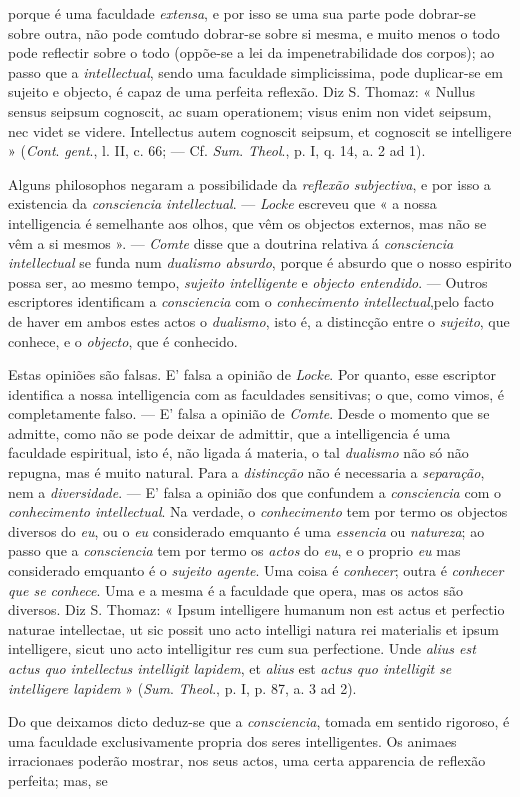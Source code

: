 porque é uma faculdade \emph{extensa}, e por isso se uma sua parte pode dobrar-se sobre outra, não pode comtudo dobrar-se sobre si mesma, e muito menos o todo pode reflectir sobre o todo (oppõe-se a lei da impenetrabilidade dos corpos); ao passo que a \emph{intellectual}, sendo uma faculdade simplicissima, pode duplicar-se em sujeito e objecto, é capaz de uma perfeita reflexão. Diz S. Thomaz: « Nullus sensus seipsum cognoscit, ac suam operationem; visus enim non videt seipsum, nec videt se videre. Intellectus autem cognoscit seipsum, et cognoscit se intelligere » (\emph{Cont}. \emph{gent}., l. II, c. 66; --- Cf. \emph{Sum}. \emph{Theol}., p. I, q. 14, a. 2 ad 1).\par Alguns philosophos negaram a possibilidade da \emph{reflexão subjectiva}, e por isso a existencia da \emph{consciencia intellectual}. --- \emph{Locke} escreveu que « a nossa intelligencia é semelhante aos olhos, que vêm os objectos externos, mas não se vêm a si mesmos ». --- \emph{Comte} disse que a doutrina relativa á \emph{consciencia intellectual} se funda num \emph{dualismo absurdo}, porque é absurdo que o nosso espirito possa ser, ao mesmo tempo, \emph{sujeito intelligente} e \emph{objecto entendido}. --- Outros escriptores identificam a \emph{consciencia} com o \emph{conhecimento intellectual},pelo facto de haver em ambos estes actos o \emph{dualismo}, isto é, a distincção entre o \emph{sujeito}, que conhece, e o \emph{objecto}, que é conhecido.\par Estas opiniões são falsas. E' falsa a opinião de \emph{Locke}. Por quanto, esse escriptor identifica a nossa intelligencia com as faculdades sensitivas; o que, como vimos, é completamente falso. --- E' falsa a opinião de \emph{Comte}. Desde o momento que se admitte, como não se pode deixar de admittir, que a intelligencia é uma faculdade espiritual, isto é, não ligada á materia, o tal \emph{dualismo} não só não repugna, mas é muito natural. Para a \emph{distincção} não é necessaria a \emph{separação}, nem a \emph{diversidade}. --- E' falsa a opinião dos que confundem a \emph{consciencia} com o \emph{conhecimento intellectual}. Na verdade, o \emph{conhecimento} tem por termo os objectos diversos do \emph{eu}, ou o \emph{eu} considerado emquanto é uma \emph{essencia} ou \emph{natureza}; ao passo que a \emph{consciencia} tem por termo os \emph{actos} do \emph{eu}, e o proprio \emph{eu} mas considerado emquanto é o \emph{sujeito agente}. Uma coisa é \emph{conhecer}; outra é \emph{conhecer que se conhece}. Uma e a mesma é a faculdade que opera, mas os actos são diversos. Diz S. Thomaz: « Ipsum intelligere humanum non est actus et perfectio naturae intellectae, ut sic possit uno acto intelligi natura rei materialis et ipsum intelligere, sicut uno acto intelligitur res cum sua perfectione. Unde \emph{alius est actus quo intellectus intelligit lapidem}, et \emph{alius} est \emph{actus quo intelligit se intelligere lapidem} » (\emph{Sum}. \emph{Theol}., p. I, p. 87, a. 3 ad 2).\par Do que deixamos dicto deduz-se que a \emph{consciencia}, tomada em sentido rigoroso, é uma faculdade exclusivamente propria dos seres intelligentes. Os animaes irracionaes poderão mostrar, nos seus actos, uma certa apparencia de reflexão perfeita; mas, se 